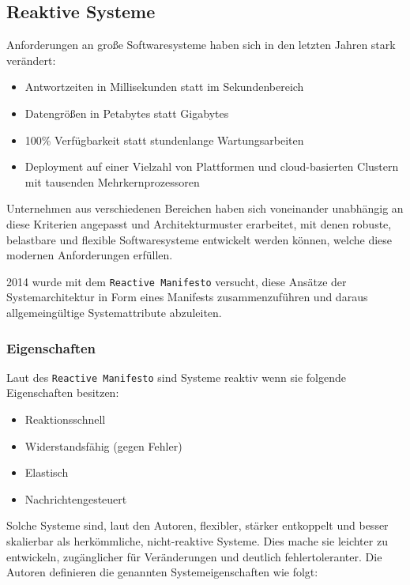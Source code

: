 \subsection{Reaktive Systeme}
\label{subsection:reaktive_systeme}
Anforderungen an große Softwaresysteme haben sich in den letzten Jahren stark verändert:
\begin{itemize}
  \item Antwortzeiten in Millisekunden statt im Sekundenbereich
  \item Datengrößen in Petabytes statt Gigabytes
  \item 100\% Verfügbarkeit statt stundenlange Wartungsarbeiten
  \item Deployment auf einer Vielzahl von Plattformen und cloud-basierten Clustern mit tausenden Mehrkernprozessoren
\end{itemize}

Unternehmen aus verschiedenen Bereichen haben sich voneinander unabhängig an diese Kriterien angepasst und Architekturmuster
erarbeitet, mit denen robuste, belastbare und flexible Softwaresysteme entwickelt werden können, welche diese modernen Anforderungen
erfüllen.

2014 wurde mit dem \verb|Reactive Manifesto| versucht, diese Ansätze der Systemarchitektur in Form eines Manifests zusammenzuführen
und daraus allgemeingültige Systemattribute abzuleiten.

\subsubsection{Eigenschaften}
\label{subsubsec:reaktive_systeme_eigenschaften}
Laut des \verb|Reactive Manifesto| sind Systeme reaktiv wenn sie folgende Eigenschaften besitzen:
\begin{itemize}
  \item Reaktionsschnell
  \item Widerstandsfähig (gegen Fehler)
  \item Elastisch
  \item Nachrichtengesteuert
\end{itemize}
Solche Systeme sind, laut den Autoren, flexibler, stärker entkoppelt und besser skalierbar als herkömmliche, nicht-reaktive Systeme.
Dies mache sie leichter zu entwickeln, zugänglicher für Veränderungen und deutlich fehlertoleranter.
Die Autoren definieren die genannten Systemeigenschaften wie folgt:
